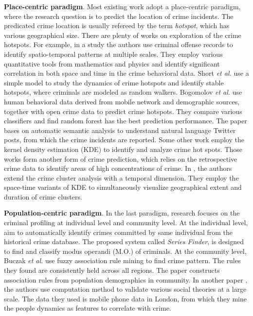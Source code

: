 \textbf{Place-centric paradigm}. Most existing work adopt a place-centric paradigm, where the research question is to predict the location of  crime incidents.  The predicated crime location is usually refereed by the term \emph{hotspot}, which has various geographical size.  There are plenty of works on exploration of the crime hotspots. For example, in a study \cite{TEP11} the authors  use criminal offense records to identify spatio-temporal patterns at multiple scales. They employ various quantitative tools from mathematics and physics and identify significant correlation in both space and time in the crime behavioral data.  Short \emph{et al.} \cite{SDPT+08} use a simple model to study the dynamics of crime hotspots and identify stable hotspots, where criminals are modeled as random walkers.  Bogomolov \emph{et al.} \cite{Bogo14} use human behavioral data derived from mobile network and demographic sources, together with open crime data to predict crime hotspots. They compare various classifiers and find random forest has the best prediction performance. The paper \cite{WGB12} bases on automatic semantic analysis to understand natural language Twitter posts, from which the crime incidents are reported. Some other work \cite{CTU08,ECCW05} employ the kernel density estimation (KDE) to identify and analyze crime hot spots. Those works form another form of crime prediction, which relies on the retrospective crime data to identify areas of high concentrations of crime. In  \cite{NaYa14}, the authors extend the crime cluster analysis with a temporal dimension. They employ the space-time variants of KDE to simultaneously visualize geographical extent and duration of crime clusters. 







\textbf{Population-centric paradigm}. In the last paradigm, research focuses on the criminal profiling at individual level and community level. At the individual level, \cite{WRWS13} aim to automatically  identify crimes committed by same individual from the historical crime database. The proposed system called \emph{Series Finder}, is designed to find and classify modus operandi (M.O.)  of criminals.  At the community level, Buczak \emph{et al.} \cite{BuGi10} use fuzzy association rule mining to find crime pattern. The rules they found are consistently held across all regions. The paper constructs association rules from population demographics in community.  In another paper \cite{TQC14}, the authors use computation method to validate various social theories at a large scale.  The data they used is mobile phone data in London, from which they mine the  people dynamics as features to correlate with crime.  


